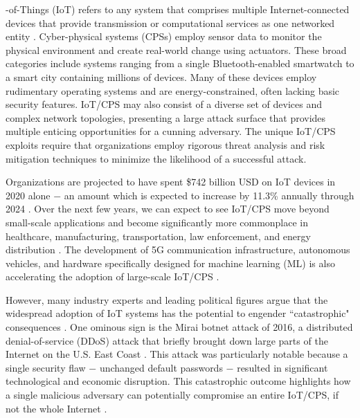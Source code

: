 \documentclass[10pt,journal,compsoc]{IEEEtran}
\begin{document}
\maketitle
\IEEEdisplaynontitleabstractindextext
\IEEEpeerreviewmaketitle

\label{Intro}
-of-Things (IoT) refers to any system that comprises multiple Internet-connected devices that provide transmission or computational services as one networked entity 
\cite{mosenia2017comprehensive}. Cyber-physical systems (CPSs) employ sensor data to monitor the 
physical environment and create real-world change using actuators. These broad categories include 
systems ranging from a single Bluetooth-enabled smartwatch to a smart city  containing millions of 
devices. Many of these devices employ rudimentary operating systems and are energy-constrained, 
often lacking basic security features. IoT/CPS may also consist of a diverse 
set of devices and complex network topologies, presenting a large attack surface that provides 
multiple enticing opportunities for a cunning adversary. The unique IoT/CPS exploits require that organizations employ rigorous threat analysis and risk mitigation techniques to minimize the likelihood of a successful attack.

\par Organizations are projected to have spent \$742 billion USD on IoT devices in 2020 alone $-$ an 
amount which is expected to increase by 11.3\% annually through 2024 \cite{idc2020}. Over the next 
few years, we can expect to see IoT/CPS move beyond small-scale applications and become significantly 
more commonplace in healthcare, manufacturing, transportation, law 
enforcement, and energy distribution
\cite{mosenia2017comprehensive, bosche2018, akmandor2018smart, stojkoska2017review, zhang2014iot, 
yun2010research, al2015role, datta2016integrating}. The development of 5G communication infrastructure, 
autonomous vehicles, and hardware specifically designed for machine learning (ML) is also accelerating 
the adoption of large-scale IoT/CPS \cite{thierer2015}. 

\par However, many industry experts and leading political figures argue that the widespread adoption 
of IoT systems has the potential to engender ``catastrophic"  consequences \cite{stavridis2016, 
lewis2016, markey2020}. One ominous sign is the Mirai botnet attack of 2016, a distributed 
denial-of-service (DDoS) attack that briefly brought down large parts of the Internet on the U.S. 
East Coast \cite{margolis2017}. This attack was particularly notable because a single security
flaw $-$ unchanged default passwords $-$ resulted in significant technological and 
economic disruption. This catastrophic outcome highlights how a single malicious adversary can 
potentially compromise an entire IoT/CPS, if not the whole Internet \cite{margolis2017}. 
\end{document}
